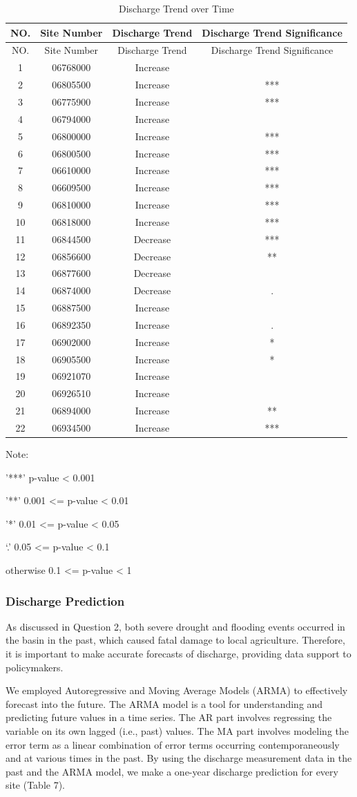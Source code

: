 \documentclass[12pt,]{article}
\begin{document}
\newpage

\begin{longtable}[]{@{}cccc@{}}
\caption{Discharge Trend over Time}\tabularnewline
\toprule
NO. & Site Number & Discharge Trend & Discharge Trend
Significance\tabularnewline
\midrule
\endfirsthead
\toprule
NO. & Site Number & Discharge Trend & Discharge Trend
Significance\tabularnewline
\midrule
\endhead
1 & 06768000 & Increase &\tabularnewline
2 & 06805500 & Increase & ***\tabularnewline
3 & 06775900 & Increase & ***\tabularnewline
4 & 06794000 & Increase &\tabularnewline
5 & 06800000 & Increase & ***\tabularnewline
6 & 06800500 & Increase & ***\tabularnewline
7 & 06610000 & Increase & ***\tabularnewline
8 & 06609500 & Increase & ***\tabularnewline
9 & 06810000 & Increase & ***\tabularnewline
10 & 06818000 & Increase & ***\tabularnewline
11 & 06844500 & Decrease & ***\tabularnewline
12 & 06856600 & Decrease & **\tabularnewline
13 & 06877600 & Decrease &\tabularnewline
14 & 06874000 & Decrease & .\tabularnewline
15 & 06887500 & Increase &\tabularnewline
16 & 06892350 & Increase & .\tabularnewline
17 & 06902000 & Increase & *\tabularnewline
18 & 06905500 & Increase & *\tabularnewline
19 & 06921070 & Increase &\tabularnewline
20 & 06926510 & Increase &\tabularnewline
21 & 06894000 & Increase & **\tabularnewline
22 & 06934500 & Increase & ***\tabularnewline
\bottomrule
\end{longtable}

Note:

'***' p-value \textless{} 0.001

'**' 0.001 \textless{}= p-value \textless{} 0.01

'*' 0.01 \textless{}= p-value \textless{} 0.05

`.' 0.05 \textless{}= p-value \textless{} 0.1

otherwise 0.1 \textless{}= p-value \textless{} 1

\hypertarget{discharge-prediction}{%
\subsubsection{Discharge Prediction}\label{discharge-prediction}}

As discussed in Question 2, both severe drought and flooding events
occurred in the basin in the past, which caused fatal damage to local
agriculture. Therefore, it is important to make accurate forecasts of
discharge, providing data support to policymakers.

We employed Autoregressive and Moving Average Models (ARMA) to
effectively forecast into the future. The ARMA model is a tool for
understanding and predicting future values in a time series. The AR part
involves regressing the variable on its own lagged (i.e., past) values.
The MA part involves modeling the error term as a linear combination of
error terms occurring contemporaneously and at various times in the
past. By using the discharge measurement data in the past and the ARMA
model, we make a one-year discharge prediction for every site (Table 7).
\end{document}
